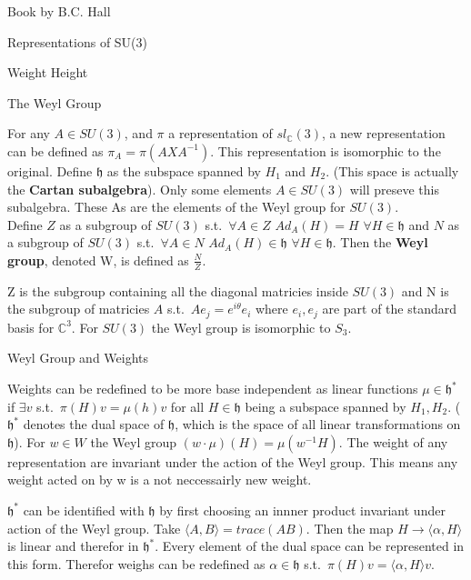 \documentclass[12pt, letterpaper]{article}
\newcommand{\C}{\mathbb{C}}
\begin{document}
\begin{section}{Book by B.C. Hall}
\begin{subsection}{Representations of SU(3)}
\begin{subsubsection}{Weight Height}
    \end{subsubsection}

    \begin{subsubsection}{The Weyl Group}

      For any \(A \in SU(3)\), and \(\pi\) a representation of \(sl_{\C}(3)\), a
      new representation can be defined as \(\pi_{A} = \pi(AXA^{-1})\). This
      representation is isomorphic to the original. Define \(\mathfrak{h}\) as
      the subspace spanned by \(H_{1}\) and \(H_{2}\). (This space is actually
      the \textbf{Cartan subalgebra}). Only some elements \(A \in SU(3)\) will
      preseve this subalgebra. These As are the elements of the Weyl group for
      \(SU(3)\). \\
      Define \(Z\) as a subgroup of \(SU(3)\) s.t.\ \(\forall A \in Z\)
      \(Ad_{A}(H) = H\) \(\forall H \in \mathfrak{h}\) and \(N\) as a subgroup
      of \(SU(3)\) s.t.\ \(\forall A \in N\) \(Ad_{A}(H) \in \mathfrak{h}\)
      \(\forall H \in \mathfrak{h}\). Then the \textbf{Weyl group}, denoted W,
      is defined as \(\frac{N}{Z}\).

      Z is the subgroup containing all the diagonal matricies inside \(SU(3)\)
      and N is the subgroup of matricies \(A\) s.t.\
      \(Ae_{j} = e^{i \theta} e_{i}\) where \(e_{i}, e_{j}\) are part of the
      standard basis for \(\C^{3}\). For \(SU(3)\) the Weyl group is isomorphic
      to \(S_{3}\).

    \end{subsubsection}

    \begin{subsubsection}{Weyl Group and Weights}

      Weights can be redefined to be more base independent as linear functions
      \(\mu \in \mathfrak{h}^{*}\) if \(\exists v\) s.t.\
      \(\pi(H)v = \mu(h)v\) for all \(H \in \mathfrak{h}\) being a subspace
      spanned by \(H_{1}, H_{2}\). (\(\mathfrak{h}^{*}\) denotes the dual space
      of \(\mathfrak{h}\), which is the space of all linear transformations on
      \(\mathfrak{h}\)). For \(w \in W\) the Weyl group \((w \cdot \mu)(H) =
      \mu(w^{-1} H)\). The weight of any representation are invariant under the
      action of the Weyl group. This means any weight acted on by w is a not
      neccessairly new weight.

      \(\mathfrak{h}^{*}\) can be identified with \(\mathfrak{h}\) by first
      choosing an innner product invariant under action of the Weyl group. Take
      \(\langle A, B \rangle = trace(AB)\). Then the map
      \(H \to \langle \alpha, H \rangle\) is linear and therefor in
      \(\mathfrak{h}^{*}\). Every element of the dual space can be represented
      in this form. Therefor weighs can be redefined as
      \(\alpha \in \mathfrak{h}\) s.t.\ \(\pi(H)v =
      \langle \alpha, H \rangle v\).


\end{subsubsection}
\end{subsection}
\end{section}
\end{document}
